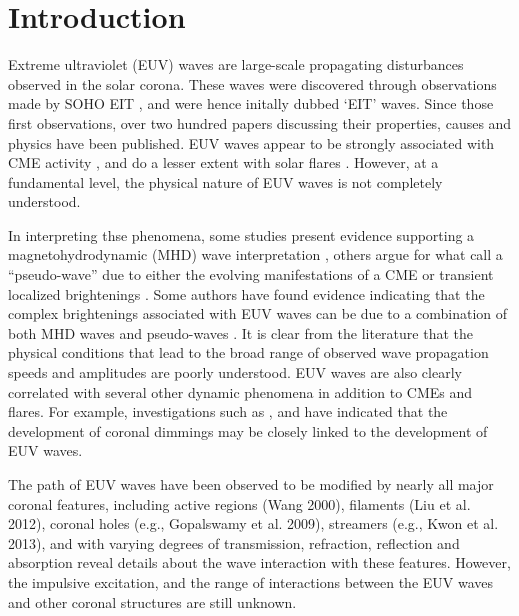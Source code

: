 \section{Introduction}\label{sec:Intro}

Extreme ultraviolet (EUV) waves are large-scale propagating
disturbances observed in the solar corona. These waves were discovered through observations made by SOHO EIT \citep{1997SoPh..175..571M, 1998GeoRL..25.2465T, 1999ApJ...517L.151T}, and were hence initally dubbed `EIT' waves. Since those first observations, over two hundred papers discussing their properties, causes and physics have been published. EUV waves appear to be strongly associated with CME activity \cite{2002ApJ...569.1009B}, and do a lesser extent with solar flares \cite{2006ApJ...641L.153}. However, at a fundamental level, the physical nature of EUV waves is not
completely understood. 

In interpreting thse phenomena, some studies present evidence supporting a magnetohydrodynamic (MHD) wave interpretation
\citep{1998GeoRL..25.2465T, 1999ApJ...517L.151T,2000ApJ...543L..89W,
  2001JGR...10625089W, 2002ApJ...574..440O, 2010ApJ...713.1008S},
others argue for what \cite{2012SoPh..281..187P} call a “pseudo-wave”
due to either the evolving manifestations of a CME
\citep{1999SoPh..190..107D, 2000ApJ...545..512D, 2008SoPh..247..123D,
  2011ApJ...738..167S} or transient localized brightenings
\citep{2007AN....328..760A, 2007ApJ...656L.101A,}.  Some authors have
found evidence indicating that the complex brightenings associated
with EUV waves can be due to a combination of both MHD waves and
pseudo-waves \citep{2002ApJ...572L..99C, 2005ApJ...622.1202C,
  2004A&A...427..705Z, 2009ApJ...705..587C}.  It is clear from the
literature that the physical conditions that lead to the broad range
of observed wave propagation speeds \citep{2011A&A...532A.151W} and
amplitudes are poorly understood. EUV waves are also clearly correlated with several other dynamic
phenomena in addition to CMEs and flares. For example, investigations such as \cite{2000SoPh..193..161T}, \cite{2004A&A...427..705Z} and \cite{2010ApJ...709..369P} have indicated that the development of coronal dimmings may be closely linked to the development of EUV
waves.

The path of EUV waves have been observed to be modified by nearly all
major coronal features, including active regions (Wang 2000),
filaments (Liu et al. 2012), coronal holes (e.g., Gopalswamy et
al. 2009), streamers (e.g., Kwon et al. 2013), and with varying
degrees of transmission, refraction, reflection and absorption reveal
details about the wave interaction with these features. However, the
impulsive excitation, and the range of interactions between the EUV
waves and other coronal structures are still unknown.

